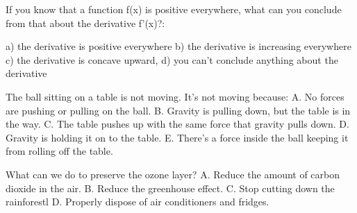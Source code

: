 

If you know that a function f(x) is positive everywhere,
    what can you conclude from that about the derivative f'(x)?:

a) the derivative is positive everywhere
b) the derivative is increasing everywhere
c) the derivative is concave upward,
d) you can't conclude anything about the derivative



The ball sitting on a table is not moving.
It's not moving because:
A. No forces are pushing or pulling on the ball.
B. Gravity is pulling down, but the table is in the way.
C. The table pushes up with the same force that gravity pulls down.
D. Gravity is holding it on to the table.
E. There's a force inside the ball keeping it from rolling off the table.


What can we do to preserve the ozone layer?
A. Reduce the amount of carbon dioxide in the air.
B. Reduce the greenhouse effect.
C. Stop cutting down the rainforestl
D. Properly dispose of air conditioners and fridges.

